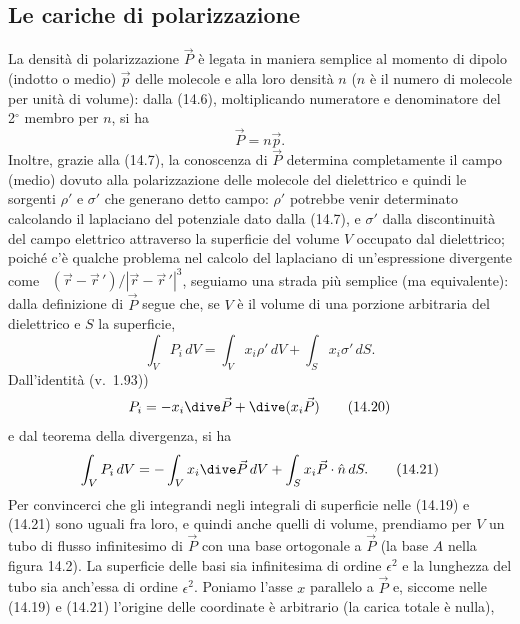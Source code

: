 \subsection{Le cariche di polarizzazione}

La densit\`a di polarizzazione $\vec P$ \`e legata in maniera semplice al
momento di dipolo (indotto o medio) $\vec p$ delle molecole e alla loro
densit\`a $n$ ($n$ \`e il numero di molecole per unit\`a di volume): dalla
(14.6), moltiplicando numeratore e denominatore del 2$^\circ$ membro per $n$, si
ha
\begin{equation}
  \vec P=n\vec p.
  \tag{14.18}
\end{equation}
Inoltre, grazie alla (14.7), la conoscenza di $\vec P$ determina completamente
il campo (medio) dovuto alla polarizzazione delle molecole del dielettrico e
quindi le sorgenti $\rho'$ e $\sigma'$ che generano detto campo: $\rho'$
potrebbe venir determinato calcolando il laplaciano del potenziale dato dalla
(14.7), e $\sigma'$ dalla discontinuit\`a del campo elettrico attraverso la
superficie del volume $V$ occupato dal dielettrico; poich\'e c'\`e qualche
problema nel calcolo del laplaciano di un'espressione divergente come
\ $(\vec r-\vec r\,')/|\vec r-\vec r\,'|^3$, seguiamo una strada pi\`u semplice
(ma equivalente): dalla definizione di $\vec P$ segue che, se $V$ \`e il volume
di una porzione arbitraria del dielettrico e $S$ la superficie,
\begin{equation}
  \int_VP_i\,dV=\int_Vx_i\rho'\,dV+\int_Sx_i\sigma'\,dS.
  \tag{14.19}
\end{equation}
Dall'identit\`a (v.\ 1.93))
\begin{equation}
  P_i=-x_i\dive\vec P+\dive(x_i\vec P)
  \tag{14.20}
\end{equation}
e dal teorema della divergenza, si ha
\begin{equation}
  \int_VP_i\,dV=-\int_Vx_i\dive\vec P\,dV+\int_Sx_i\vec P\cdot\hat n\,dS.
  \tag{14.21}
\end{equation}
Per convincerci che gli integrandi negli integrali di superficie nelle (14.19) e
(14.21) sono uguali fra loro, e quindi anche quelli di volume, prendiamo per $V$
un tubo di flusso infinitesimo di $\vec P$ con una base ortogonale a $\vec P$
(la base $A$ nella figura 14.2). La superficie delle basi sia infinitesima di
ordine $\epsilon^2$ e la lunghezza del tubo sia anch'essa di ordine
$\epsilon^2$. Poniamo l'asse $x$ parallelo a $\vec P$ e, siccome nelle (14.19) e
(14.21) l'origine delle coordinate \`e arbitrario (la carica totale \`e nulla),
